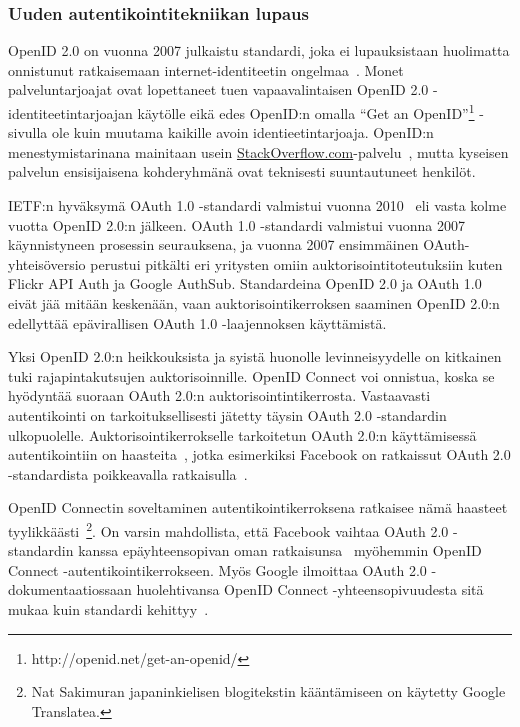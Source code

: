 \documentclass[finnish,gradu]{tktltiki}
\begin{document}
  \subsubsection{Uuden autentikointitekniikan lupaus} %
  \label{ssub:uuden_autentikointitekniikan_lupaus}

  OpenID 2.0 on vuonna 2007 julkaistu standardi, joka ei lupauksistaan huolimatta onnistunut ratkaisemaan internet-identiteetin ongelmaa~\cite{openid_most_successful_failure_2011, openid_failure_obasanjo_2011, openid_failure_edge_2011}. Monet palveluntarjoajat ovat lopettaneet tuen vapaavalintaisen OpenID 2.0 -identiteetintarjoajan käytölle eikä edes OpenID:n omalla ``Get an OpenID''\footnote{http://openid.net/get-an-openid/} -sivulla ole kuin muutama kaikille avoin identieetintarjoaja. OpenID:n menestymistarinana mainitaan usein \url{StackOverflow.com}-palvelu~\cite{openid_success_stackoverflow_2010}, mutta kyseisen palvelun ensisijaisena kohderyhmänä ovat teknisesti suuntautuneet henkilöt.

  IETF:n hyväksymä OAuth 1.0 -standardi valmistui vuonna 2010~\cite{ietf_oauth1} eli vasta kolme vuotta OpenID 2.0:n jälkeen. OAuth 1.0 -standardi valmistui vuonna 2007 käynnistyneen prosessin seurauksena, ja vuonna 2007 ensimmäinen OAuth-yhteisöversio perustui pitkälti eri yritysten omiin auktorisointitoteutuksiin kuten Flickr API Auth ja Google AuthSub. Standardeina OpenID 2.0 ja OAuth 1.0 eivät jää mitään keskenään, vaan auktorisointikerroksen saaminen OpenID 2.0:n edellyttää epävirallisen OAuth 1.0 -laajennoksen käyttämistä.

  Yksi OpenID 2.0:n heikkouksista ja syistä huonolle levinneisyydelle on kitkainen tuki rajapintakutsujen auktorisoinnille. OpenID Connect voi onnistua, koska se hyödyntää suoraan OAuth 2.0:n auktorisointintikerrosta. Vastaavasti autentikointi on tarkoituksellisesti jätetty täysin OAuth 2.0 -standardin ulkopuolelle. Auktorisointikerrokselle tarkoitetun OAuth 2.0:n käyttämisessä autentikointiin on haasteita~\cite{bradley_oauth_authentication_problem_2012, bradley_oauth_implicit_flow_vulnerability_2012}, jotka esimerkiksi Facebook on ratkaissut OAuth 2.0 -standardista poikkeavalla ratkaisulla~\cite{bradley_facebook_id_tokens_2012, facebook_oauth2_signed_request}.

  OpenID Connectin soveltaminen autentikointikerroksena ratkaisee nämä haasteet tyylikkäästi~\cite{bradley_openid_c_id_token_2012, bradley_facebook_for_authentication_2012 sakimura_oauth_authentication_problem_2012}\footnote{Nat Sakimuran japaninkielisen blogitekstin kääntämiseen on käytetty Google Translatea.}. On varsin mahdollista, että Facebook vaihtaa OAuth 2.0 -standardin kanssa epäyhteensopivan oman ratkaisunsa~\cite{bradley_facebook_id_tokens_2012, facebook_oauth2_signed_request} myöhemmin OpenID Connect -autentikointikerrokseen. Myös Google ilmoittaa OAuth 2.0 -dokumentaatiossaan huolehtivansa OpenID Connect -yhteensopivuudesta sitä mukaa kuin standardi kehittyy~\cite{google_oauth2_login}.
\end{document}
